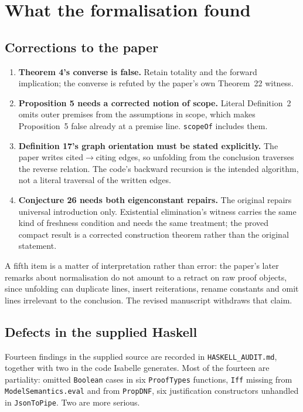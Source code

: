 \documentclass[11pt]{article}
\theoremstyle{plain}
\newcommand{\ubrk}{\_\discretionary{}{}{}}
\newcommand{\isa}[1]{\textup{\texttt{\small #1}}}
\newcommand{\thy}[1]{\textup{\texttt{\small #1}}}
\begin{document}
\section{What the formalisation found}\label{sec:found}

\subsection{Corrections to the paper}

\begin{enumerate}
\item \textbf{Theorem 4's converse is false.} Retain totality and the forward
  implication; the converse is refuted by the paper's own Theorem~22 witness.
\item \textbf{Proposition 5 needs a corrected notion of scope.} Literal
  Definition~2 omits outer premises from the assumptions in scope, which makes
  Proposition~5 false already at a premise line. \isa{scopeOf} includes them.
\item \textbf{Definition 17's graph orientation must be stated explicitly.} The
  paper writes cited$\to$citing edges, so unfolding from the conclusion
  traverses the reverse relation. The code's backward recursion is the intended
  algorithm, not a literal traversal of the written edges.
\item \textbf{Conjecture 26 needs both eigenconstant repairs.} The original
  repairs universal introduction only. Existential elimination's witness
  carries the same kind of freshness condition and needs the same treatment;
  the proved compact result is a corrected construction theorem rather than the
  original statement.
\end{enumerate}

\noindent
A fifth item is a matter of interpretation rather than error: the paper's later
remarks about normalisation do not amount to a retract on raw proof objects,
since unfolding can duplicate lines, insert reiterations, rename constants and
omit lines irrelevant to the conclusion. The revised manuscript withdraws that
claim.

\subsection{Defects in the supplied Haskell}

Fourteen findings in the supplied source are recorded in
\thy{HASKELL\ubrk{}AUDIT.md}, together with two in the code Isabelle generates.
Most of the fourteen are partiality:
omitted \isa{Boolean} cases in six \thy{ProofTypes} functions, \isa{Iff} missing
from \isa{ModelSemantics.eval} and from \thy{PropDNF}, six justification
constructors unhandled in \thy{JsonToPipe}. Two are more serious.
\end{document}
